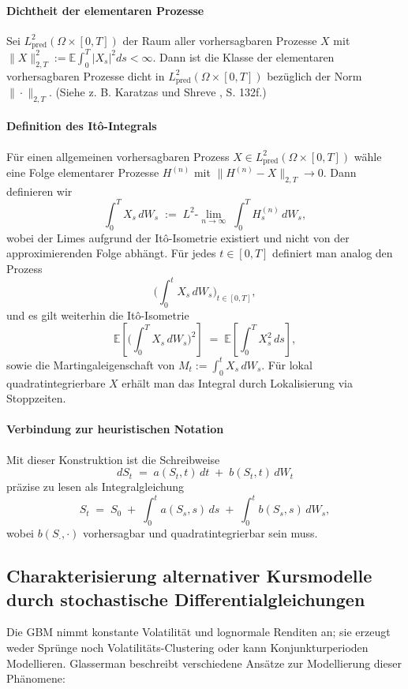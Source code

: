 \paragraph{Dichtheit der elementaren Prozesse}
Sei $L^2_{\mathrm{pred}}(\Omega\times[0,T])$ der Raum aller vorhersagbaren Prozesse $X$ mit
$\|X\|_{2,T}^2 := \mathbb E\!\int_0^T |X_s|^2 ds <\infty$.
Dann ist die Klasse der elementaren vorhersagbaren Prozesse dicht in $L^2_{\mathrm{pred}}(\Omega\times[0,T])$ bezüglich der Norm $\|\cdot\|_{2,T}$. (Siehe z. B. Karatzas und Shreve \cite{karatzas_brownian_1991}, S. 132f.)
\paragraph{Definition des It\^o-Integrals}
Für einen allgemeinen vorhersagbaren Prozess $X\in L^2_{\mathrm{pred}}(\Omega\times[0,T])$ wähle eine Folge elementarer Prozesse $H^{(n)}$ mit
$\|H^{(n)}-X\|_{2,T}\to 0$. Dann definieren wir
$$
\int_0^T X_s\,dW_s \;:=\; L^2\text{-}\lim_{n\to\infty}\;\int_0^T H^{(n)}_s\,dW_s,
$$
wobei der Limes aufgrund der It\^o-Isometrie existiert und nicht von der approximierenden Folge abhängt. Für jedes $t\in[0,T]$ definiert man analog den Prozess
$$
\Big(\int_0^t X_s\,dW_s\Big)_{t\in[0,T]},
$$
und es gilt weiterhin die It\^o-Isometrie
$$
\mathbb E\!\left[\Big(\int_0^T X_s\,dW_s\Big)^{\!2}\right] \;=\; \mathbb E\!\left[\int_0^T X_s^{2}\,ds\right],
$$
sowie die Martingaleigenschaft von $M_t:=\int_0^t X_s\,dW_s$. Für lokal quadratintegrierbare $X$ erhält man das Integral durch Lokalisierung via Stoppzeiten.

\paragraph{Verbindung zur heuristischen Notation}
Mit dieser Konstruktion ist die Schreibweise
$$
dS_t \;=\; a(S_t,t)\,dt \;+\; b(S_t,t)\,dW_t
$$
präzise zu lesen als Integralgleichung
$$
S_t \;=\; S_0 \;+\; \int_0^t a(S_s,s)\,ds \;+\; \int_0^t b(S_s,s)\,dW_s,
$$
wobei $b(S_\cdot,\cdot)$ vorhersagbar und quadratintegrierbar sein muss.


\subsection{Charakterisierung alternativer Kursmodelle durch stochastische Differentialgleichungen}

Die GBM nimmt konstante Volatilität und lognormale Renditen an; sie erzeugt weder Sprünge noch Volatilitäts-Clustering oder kann Konjunkturperioden Modellieren.
Glasserman \cite{glasserman2003monte} beschreibt verschiedene Ansätze zur Modellierung dieser Phänomene:

